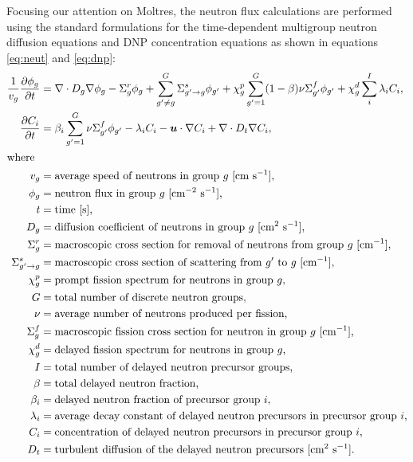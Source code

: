 Focusing our attention on Moltres, the neutron flux calculations are
performed using the standard formulations for the time-dependent multigroup
neutron diffusion equations and \gls{DNP} concentration equations as shown in
equations \ref{eq:neut} and \ref{eq:dnp}:
%
\begin{align}
    \frac{1}{v_g} \frac{\partial \phi_g}{\partial t} &= \nabla \cdot D_g
    \nabla \phi_g - \Sigma^r_g \phi_g +
    \sum^G_{g' \neq g} \Sigma^s_{g' \rightarrow g} \phi_{g'} + \chi^p_g
    \sum^G_{g'=1} (1-\beta) \nu \Sigma^f_{g'} \phi_{g'} + \chi^d_g \sum^I_i
    \lambda_i C_i, \label{eq:neut} \\
    \frac{\partial C_i}{\partial t} &= \beta_i \sum^G_{g'=1} \nu \Sigma^f_{g'}
    \phi_{g'} - \lambda_i C_i - \boldsymbol{u} \cdot \nabla C_i + \nabla \cdot
    D_t \nabla C_i, \label{eq:dnp} \\
    \intertext{where}
    v_g &= \text{average speed of neutrons in group $g$ [cm s$^{-1}$],} 
    \nonumber \\
    \phi_g &= \text{neutron flux in group $g$ [cm$^{-2}$ s$^{-1}$],} \nonumber
    \\
    t &= \text{time [s],} \nonumber \\
    D_g &= \text{diffusion coefficient of neutrons in group $g$ [cm$^2$
    s$^{-1}$],} \nonumber \\
    \Sigma^r_g &= \text{macroscopic cross section for removal of neutrons from
    group $g$ [cm$^{-1}$],} \nonumber \\
    \Sigma^s_{g' \rightarrow g} &= \text{macroscopic cross section of
    scattering from $g'$ to $g$ [cm$^{-1}$],} \nonumber \\
    \chi^p_g &= \text{prompt fission spectrum for neutrons in group $g$,}
    \nonumber \\
    G &= \text{total number of discrete neutron groups,} \nonumber \\
    \nu &= \text{average number of neutrons produced per fission,} \nonumber
    \\
    \Sigma^f_{g} &= \text{macroscopic fission cross section for neutron in
    group $g$ [cm$^{-1}$],} \nonumber \\
    \chi^d_g &= \text{delayed fission spectrum for neutrons in group $g$,}
    \nonumber \\
    I &= \text{total number of delayed neutron precursor groups,} \nonumber \\
    \beta &= \text{total delayed neutron fraction,} \nonumber \\
    \beta_i &= \text{delayed neutron fraction of precursor group $i$,}
    \nonumber \\
    \lambda_i &= \text{average decay constant of delayed neutron precursors in
    precursor group $i$,} \nonumber \\
    C_i &= \text{concentration of delayed neutron precursors in precursor
    group $i$,} \nonumber \\
    D_t &= \text{turbulent diffusion of the delayed neutron precursors [cm$^2$
    s$^{-1}$].} \nonumber
\end{align}
%

